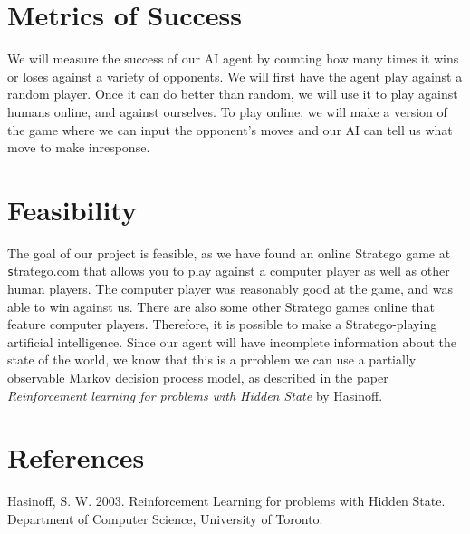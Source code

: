 \documentclass[letterpaper]{article}
\begin{document}
\section{Metrics of Success}
We will measure the success of our AI agent by counting how many times it wins or loses against a variety of opponents. We will first have the agent play against a random player. Once it can do better than random, we will use it to play against humans online, and against ourselves.  To play online, we will make a version of the game where we can input the opponent's moves and our AI can tell us what move to make inresponse.


\section{Feasibility}
The goal of our project is feasible, as we have found an online Stratego game at {\texttt stratego.com} that allows you to play against a computer player as well as other human players. The computer player was reasonably good at the game, and was able to win against us. There are also some other Stratego games online that feature computer players. Therefore, it is possible to make a Stratego-playing artificial intelligence. Since our agent will have incomplete information about the state of the world, we know that this is a prroblem we can use a partially observable Markov decision process model, as described in the paper {\it Reinforcement learning for problems with Hidden State} by Hasinoff.

\section{References}
Hasinoff, S. W. 2003. Reinforcement Learning for problems with Hidden State. Department of Computer Science, University of Toronto.
\end{document}

